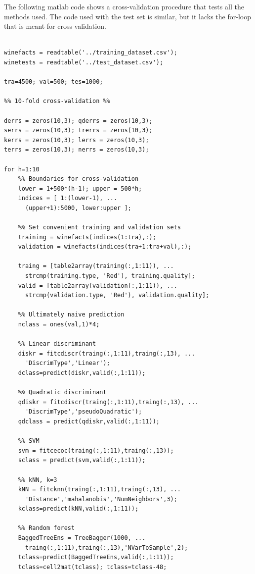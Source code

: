 \documentclass[twoside]{article}
\begin{document}
\begin{multicols}{2}
The following matlab code shows a cross-validation procedure
that tests all the methods used. The code used with the test
set is similar, but it lacks the for-loop that is meant for 
cross-validation.

{\footnotesize

\begin{verbatim}

winefacts = readtable('../training_dataset.csv');
winetests = readtable('../test_dataset.csv');

tra=4500; val=500; tes=1000;

%% 10-fold cross-validation %%

derrs = zeros(10,3); qderrs = zeros(10,3); 
serrs = zeros(10,3); trerrs = zeros(10,3); 
kerrs = zeros(10,3); lerrs = zeros(10,3); 
terrs = zeros(10,3); nerrs = zeros(10,3);

for h=1:10
    %% Boundaries for cross-validation
    lower = 1+500*(h-1); upper = 500*h;
    indices = [ 1:(lower-1), ... 
      (upper+1):5000, lower:upper ];

    %% Set convenient training and validation sets
    training = winefacts(indices(1:tra),:);
    validation = winefacts(indices(tra+1:tra+val),:);

    traing = [table2array(training(:,1:11)), ... 
      strcmp(training.type, 'Red'), training.quality];
    valid = [table2array(validation(:,1:11)), ...
      strcmp(validation.type, 'Red'), validation.quality];

    %% Ultimately naive prediction
    nclass = ones(val,1)*4;
    
    %% Linear discriminant
    diskr = fitcdiscr(traing(:,1:11),traing(:,13), ...
      'DiscrimType','Linear');
    dclass=predict(diskr,valid(:,1:11));

    %% Quadratic discriminant
    qdiskr = fitcdiscr(traing(:,1:11),traing(:,13), ...
      'DiscrimType','pseudoQuadratic');
    qdclass = predict(qdiskr,valid(:,1:11));
    
    %% SVM
    svm = fitcecoc(traing(:,1:11),traing(:,13));
    sclass = predict(svm,valid(:,1:11));
    
    %% kNN, k=3
    kNN = fitcknn(traing(:,1:11),traing(:,13), ...
      'Distance','mahalanobis','NumNeighbors',3);
    kclass=predict(kNN,valid(:,1:11));

    %% Random forest
    BaggedTreeEns = TreeBagger(1000, ...
      traing(:,1:11),traing(:,13),'NVarToSample',2);
    tclass=predict(BaggedTreeEns,valid(:,1:11));
    tclass=cell2mat(tclass); tclass=tclass-48;


\end{verbatim}}
\end{multicols}
\end{document}
